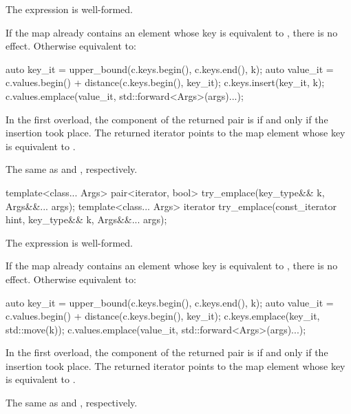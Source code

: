 \begin{codeblock}
\begin{codeblock}
\begin{codeblock}
\begin{addedblock}
\begin{itemdescr}
\pnum
\constraints
The expression  is
well-formed.

\pnum
\effects
If the map already contains an element whose key is equivalent to ,
there is no effect.  Otherwise equivalent to:
\begin{codeblock}
auto key_it = upper_bound(c.keys.begin(), c.keys.end(), k);
auto value_it = c.values.begin() + distance(c.keys.begin(), key_it);
c.keys.insert(key_it, k);
c.values.emplace(value_it, std::forward<Args>(args)...);
\end{codeblock}

\pnum
\returns
In the first overload, the  component of the returned pair
is  if and only if the insertion took place.  The returned
iterator points to the map element whose key is equivalent to .

\pnum
\complexity
The same as  and ,
respectively.
\end{itemdescr}

%
\begin{itemdecl}
template<class... Args>
  pair<iterator, bool> try_emplace(key_type&& k, Args&&... args);
template<class... Args>
  iterator try_emplace(const_iterator hint, key_type&& k, Args&&... args);
\end{itemdecl}

\begin{itemdescr}
\pnum
\constraints
The expression  is
well-formed.

\pnum
\effects
If the map already contains an element whose key is equivalent to ,
there is no effect.  Otherwise equivalent to:
\begin{codeblock}
auto key_it = upper_bound(c.keys.begin(), c.keys.end(), k);
auto value_it = c.values.begin() + distance(c.keys.begin(), key_it);
c.keys.emplace(key_it, std::move(k));
c.values.emplace(value_it, std::forward<Args>(args)...);
\end{codeblock}

\pnum
\returns
In the first overload,
the  component of the returned pair is 
if and only if the insertion took place.
The returned iterator points to the map element
whose key is equivalent to .

\pnum
\complexity
The same as  and ,
respectively.
\end{itemdescr}


\end{addedblock}
\end{codeblock}
\end{codeblock}
\end{codeblock}
